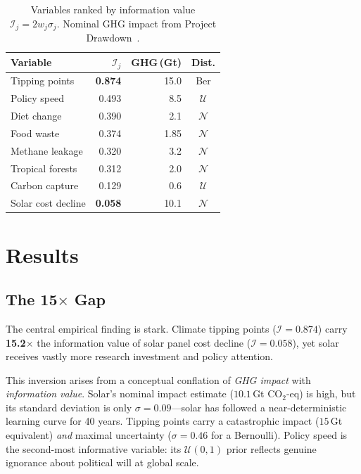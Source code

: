 \documentclass[10pt,twocolumn]{article}
\begin{document}
\begin{table}[t]
\centering
\caption{Variables ranked by information value $\mathcal{I}_j = 2w_j\sigma_j$.
Nominal GHG impact from Project Drawdown~\cite{drawdown2026}.}
\label{tab:ranking}
\small
\begin{tabular}{lrrc}
\toprule
Variable & $\mathcal{I}_j$ & GHG\,(Gt) & Dist.\\
\midrule
Tipping points      & \textbf{0.874} & 15.0 & Ber \\
Policy speed        & 0.493          & 8.5  & $\mathcal{U}$ \\
Diet change         & 0.390          & 2.1  & $\mathcal{N}$ \\
Food waste          & 0.374          & 1.85 & $\mathcal{N}$ \\
Methane leakage     & 0.320          & 3.2  & $\mathcal{N}$ \\
Tropical forests    & 0.312          & 2.0  & $\mathcal{N}$ \\
Carbon capture      & 0.129          & 0.6  & $\mathcal{U}$ \\
Solar cost decline  & \textbf{0.058} & 10.1 & $\mathcal{N}$ \\
\bottomrule
\end{tabular}
\end{table}

\section{Results}

\subsection{The 15$\times$ Gap}

The central empirical finding is stark.  Climate tipping points
($\mathcal{I} = 0.874$) carry \textbf{15.2$\times$} the information
value of solar panel cost decline ($\mathcal{I} = 0.058$), yet solar
receives vastly more research investment and policy attention.

This inversion arises from a conceptual conflation of
\emph{GHG impact} with \emph{information value}.  Solar's nominal
impact estimate ($10.1$\,Gt CO$_2$-eq) is high, but its standard
deviation is only $\sigma=0.09$---solar has followed a
near-deterministic learning curve for 40 years.  Tipping points carry
a catastrophic impact ($15$\,Gt equivalent) \emph{and} maximal
uncertainty ($\sigma=0.46$ for a Bernoulli).  Policy speed is the
second-most informative variable: its $\mathcal{U}(0,1)$ prior
reflects genuine ignorance about political will at global scale.
\end{document}
